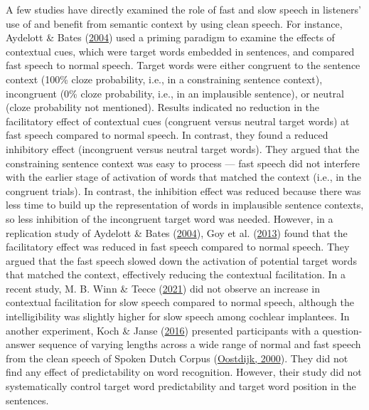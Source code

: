\documentclass[a4paper, nobind]{templates/ociamthesis}
\begin{document}
A few studies have directly examined the role of fast and slow speech in listeners' use of and benefit from semantic context by using clean speech.
For instance, Aydelott \& Bates (\protect\hyperlink{ref-Aydelott2004}{2004}) used a priming paradigm to examine the effects of contextual cues, which were target words embedded in sentences, and compared fast speech to normal speech.
Target words were either congruent to the sentence context (100\% cloze probability, i.e., in a constraining sentence context), incongruent (0\% cloze probability, i.e., in an implausible sentence), or neutral (cloze probability not mentioned).
Results indicated no reduction in the facilitatory effect of contextual cues (congruent versus neutral target words) at fast speech compared to normal speech. In contrast, they found a reduced inhibitory effect (incongruent versus neutral target words).
They argued that the constraining sentence context was easy to process --- fast speech did not interfere with the earlier stage of activation of words that matched the context (i.e., in the congruent trials).
In contrast, the inhibition effect was reduced because there was less time to build up the representation of words in implausible sentence contexts, so less inhibition of the incongruent target word was needed.
However, in a replication study of Aydelott \& Bates (\protect\hyperlink{ref-Aydelott2004}{2004}), Goy et al. (\protect\hyperlink{ref-Goy2013}{2013}) found that the facilitatory effect was reduced in fast speech compared to normal speech.
They argued that the fast speech slowed down the activation of potential target words that matched the context, effectively reducing the contextual facilitation.
In a recent study, M. B. Winn \& Teece (\protect\hyperlink{ref-Winn2021}{2021}) did not observe an increase in contextual facilitation for slow speech compared to normal speech, although the intelligibility was slightly higher for slow speech among cochlear implantees.
In another experiment, Koch \& Janse (\protect\hyperlink{ref-Koch2016}{2016}) presented participants with a question-answer sequence of varying lengths across a wide range of normal and fast speech from the clean speech of Spoken Dutch Corpus (\protect\hyperlink{ref-Oostdijk2000}{Oostdijk, 2000}).
They did not find any effect of predictability on word recognition. However, their study did not systematically control target word predictability and target word position in the sentences.
\end{document}
